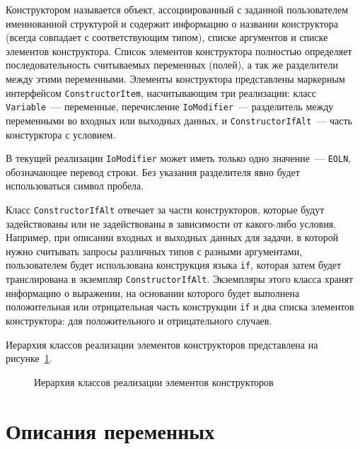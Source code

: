 \documentclass[times,specification,annotation]{style/itmo-student-thesis/itmo-student-thesis}
\begin{document}
Конструктором называется объект, ассоциированный с заданной пользователем именнованной структурой и содержит информацию о названии конструктора (всегда совпадает с соответствующим типом), списке аргументов и списке элементов конструктора. Список элементов конструктора полностью определяет последовательность считываемых переменных (полей), а так же разделители между этими переменными. Элементы конструктора представлены маркерным интерфейсом \texttt{ConstructorItem}, насчитывающим три реализации: класс \texttt{Variable}~--- переменные, перечисление \texttt{IoModifier}~--- разделитель между переменными во входных или выходных данных, и \texttt{ConstructorIfAlt}~--- часть констурктора с условием.

В текущей реализации \texttt{IoModifier} может иметь только одно значение~--- \texttt{EOLN}, обозначающее перевод строки. Без указания разделителя явно будет использоваться символ пробела.

Класс \texttt{ConstructorIfAlt} отвечает за части конструкторов, которые будут задействованы или не задействованы в зависимости от какого-либо условия. Например, при описании входных и выходных данных для задачи, в которой нужно считывать запросы различных типов с разными аргументами, пользователем будет использована конструкция языка \texttt{if}, которая затем будет транслирована в экземпляр \texttt{ConstructorIfAlt}. Экземпляры этого класса хранят информацию о выражении, на основании которого будет выполнена положительная или отрицательная часть конструкции \texttt{if} и два списка элементов конструктора: для положительного и отрицательного случаев.

Иерархия классов реализации элементов конструкторов представлена на рисунке~\ref{constructor-items-classes-hierarchy}.

\begin{figure}[!h]
\caption{Иерархия классов реализации элементов конструкторов}\label{constructor-items-classes-hierarchy}
\centering
{}
\end{figure}

\section{Описания переменных}
\end{document}
